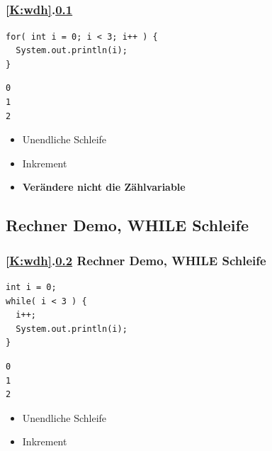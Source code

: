 \documentclass[c,18pt]{beamer}
\begin{document}
\subsection{\stitle}\label{S:RechnerDemo}
\begin{frame}[fragile]%
  \frametitle{\ref{K:wdh}.\ref{S:RechnerDemo} \stitle}%


\begin{lstlisting}[title={Beispiel Programm},style=java, frame=single]
for( int i = 0; i < 3; i++ ) {
  System.out.println(i);
}
\end{lstlisting}
\bigskip

\begin{lstlisting}[title=output,style=java, frame=single]
0
1
2
\end{lstlisting}
\hfill

\begin{itemize}
\item Unendliche Schleife
\item Inkrement
\item \textbf{Verändere nicht die Zählvariable}
\end{itemize}
\end{frame}


\def\stitle{Rechner Demo, WHILE Schleife}
\subsection{\stitle}\label{S:RechnerDemo2}
\begin{frame}[fragile]%
  \frametitle{\ref{K:wdh}.\ref{S:RechnerDemo2} \stitle}%


\begin{lstlisting}[title={Beispiel Programm},style=java, frame=single]
int i = 0;
while( i < 3 ) {
  i++;
  System.out.println(i);
}
\end{lstlisting}
\bigskip

\begin{lstlisting}[title=output,style=java, frame=single]
0
1
2
\end{lstlisting}
\hfill

\begin{itemize}
\item Unendliche Schleife
\item Inkrement
\end{itemize}
\end{frame}
\end{document}
